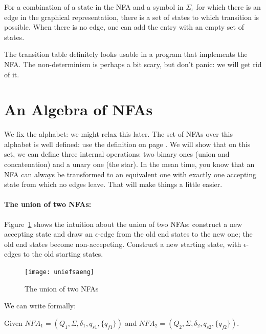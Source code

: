 For a combination of a state in the NFA and a symbol in
$\Sigma_\epsilon$ for which there is an edge in the graphical
representation, there is a set of states to which transition is
possible. When there is no edge, one can add the entry with an empty
set of states.

The transition table definitely looks usable in a program that
implements the NFA. The non-determinism is perhaps a bit scary, but
don't panic: we will get rid of it.




\section{An Algebra of NFAs}

We fix the alphabet: we might relax this later. The set of NFAs
over this alphabet is well defined: use the definition on page
\pageref{nfadef}. We will show that on this set, we can define three
internal operations: two binary ones (union and concatenation) and a
unary one (the star). In the mean time, you know that an NFA can
always be transformed to an equivalent one with exactly one accepting
state from which no edges leave. That will make things a little easier.

\paragraph{The union of two NFAs:}


Figure~\ref{uniefsa} shows the intuition about the union of two NFAs:
construct a new accepting state and draw an $\epsilon$-edge from the
old end states to the new one; the old end states become
non-accepeting. Construct a new starting state, with $\epsilon$-edges
to the old starting states.


\begin{figure}[h]
\begin{center}\texttt{[image: uniefsaeng]}\end{center}
\caption{The union of two NFAs\label{uniefsa}}
\end{figure}

We can write formally:

Given $NFA_1 = (Q_1,\Sigma,\delta_1,q_{s1},\{q_{f1}\})$ and
%
$NFA_2 = (Q_2,\Sigma,\delta_2,q_{s2},\{q_{f2}\})$.

